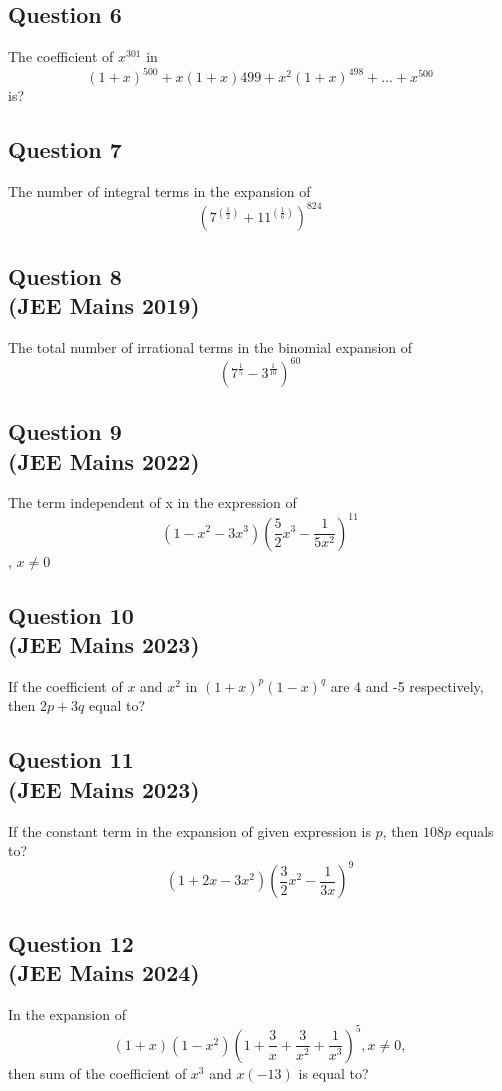 \subsection*{Question 6}
The coefficient of $x^{301}$ in \[
(1+x)^{500}+x(1+x){499}+x^{2}(1+x)^{498}+...+x^{500}
\] is?

\subsection*{Question 7}
The number of integral terms in the expansion of \[
(7^{(\frac{1}{2})}+11^{(\frac{1}{6})})^{824}
\]

\subsection*{Question 8 \\ \small(JEE Mains 2019)}
The total number of irrational terms in the binomial expansion of \[
(7^{\frac{1}{5}}-3^{\frac{1}{10}})^{60}
\]

\subsection*{Question 9 \\ \small(JEE Mains 2022)}
The term independent of x in the expression of \[
(1-x^2-3x^3)({\frac{5}{2}x^3-\frac{1}{5x^2}})^{11}
\], $x \ne 0$

\subsection*{Question 10 \\ \small(JEE Mains 2023)}
If the coefficient of $x$ and $x^2$ in $(1+x)^p(1-x)^q$ are 4 and -5 respectively, then $2p+3q$ equal to?

\subsection*{Question 11 \\ \small(JEE Mains 2023)}
If the constant term in the expansion of given expression is $p$, then $108p$ equals to? \[
(1+2x-3x^2)(\frac{3}{2}x^2-\frac{1}{3x})^9
\]


\subsection*{Question 12 \\ \small(JEE Mains 2024)}
In the expansion of \[
(1+x)(1-x^2)(1+\frac{3}{x}+\frac{3}{x^2}+\frac{1}{x^3})^5, x\ne 0,
\] then sum of the coefficient of $x^3$ and $x(-13)$ is equal to?

